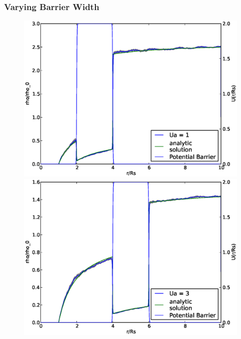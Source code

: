 \subsubsection{Varying Barrier Width}
\begin{figure}[H]
\centering
\begin{minipage}{.5 \textwidth}
    \centering
    \includegraphics[width=.95 \textwidth, keepaspectratio]{plots/cp/ub/Ua1.eps}
\end{minipage}\begin{minipage}{.5 \textwidth}
    \includegraphics[width=.95 \textwidth, keepaspectratio]{plots/cp/ub/Ua3.eps}
\end{minipage}
\begin{minipage}{.5 \textwidth}

\end{minipage}
\end{figure}
